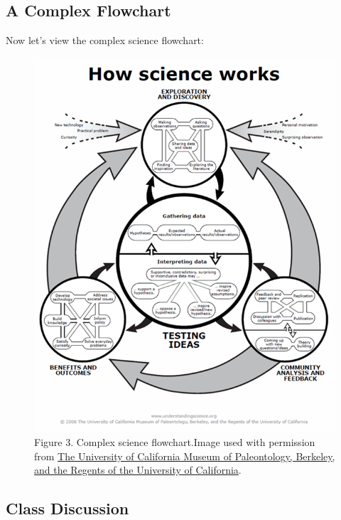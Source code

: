 \documentclass[
]{book}
\begin{document}
\hypertarget{a-complex-flowchart}{%
\subsection*{A Complex Flowchart}\label{a-complex-flowchart}}

Now let's view the complex science flowchart:

\begin{figure}
\centering
\includegraphics{figures_images/Lab2a-Fig3.png}
\caption{Figure 3. Complex science flowchart.Image used with permission from \href{www.understandingscience.org}{The University of California Museum of Paleontology, Berkeley, and the Regents of the University of California}.}
\end{figure}

\hypertarget{class-discussion}{%
\subsection*{Class Discussion}\label{class-discussion}}
\end{document}
